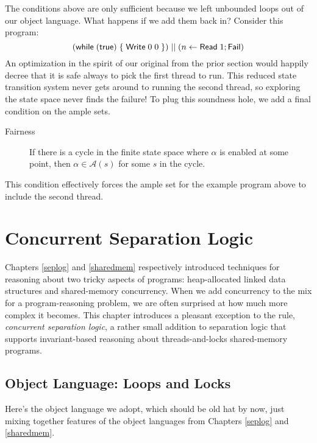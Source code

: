 \documentclass{amsbook}
\theoremstyle{definition}
\theoremstyle{remark}
\numberwithin{section}{chapter}
\numberwithin{equation}{chapter}
\begin{document}
The conditions above are only sufficient because we left unbounded loops out of our object language.
What happens if we add them back in?
Consider this program:
$$(\mathsf{while} \; (\mathsf{true}) \; \{ \; \mathsf{Write} \; 0 \; 0 \; \}) \; || \; (n \leftarrow \mathsf{Read} \; 1; \mathsf{Fail})$$
An optimization in the spirit of our original from the prior section would happily decree that it is safe always to pick the first thread to run.
This reduced state transition system never gets around to running the second thread, so exploring the state space never finds the failure!
To plug this soundness hole, we add a final condition on the ample sets.

\begin{description}
  \item[Fairness] If there is a cycle in the finite state space where $\alpha$ is enabled at some point, then $\alpha \in \mathcal A(s)$ for some $s$ in the cycle.
\end{description}

This condition effectively forces the ample set for the example program above to include the second thread.



\chapter{Concurrent Separation Logic}

Chapters \ref{seplog} and \ref{sharedmem} respectively introduced techniques for reasoning about two tricky aspects of programs: heap-allocated linked data structures and shared-memory concurrency.
When we add concurrency to the mix for a program-reasoning problem, we are often surprised at how much more complex it becomes.
This chapter introduces a pleasant exception to the rule, \emph{concurrent separation logic}, a rather small addition to separation logic that supports invariant-based reasoning about threads-and-locks shared-memory programs.

\section{Object Language: Loops and Locks}

Here's the object language we adopt, which should be old hat by now, just mixing together features of the object languages from Chapters \ref{seplog} and \ref{sharedmem}.
\end{document}
